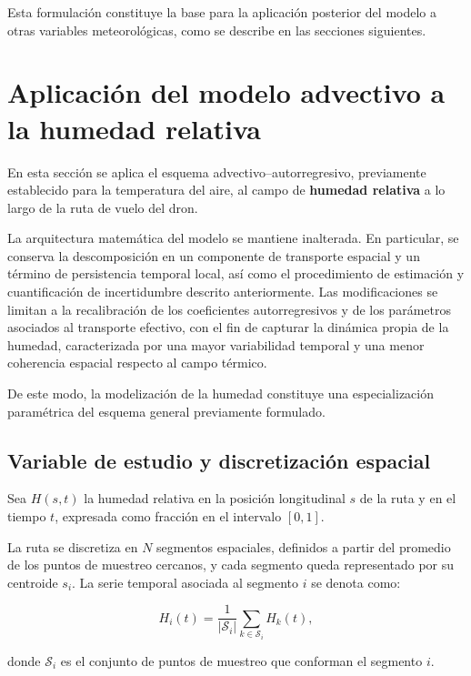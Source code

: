 \documentclass[
  spanish,
  us-letterpaper,
]{scrreprt}
\numberwithin{equation}{section}
\begin{document}
Esta formulación constituye la base para la aplicación posterior del
modelo a otras variables meteorológicas, como se describe en las
secciones siguientes.

\section{Aplicación del modelo advectivo a la humedad
relativa}\label{aplicaciuxf3n-del-modelo-advectivo-a-la-humedad-relativa}

En esta sección se aplica el esquema advectivo--autorregresivo,
previamente establecido para la temperatura del aire, al campo de
\textbf{humedad relativa} a lo largo de la ruta de vuelo del dron.

La arquitectura matemática del modelo se mantiene inalterada. En
particular, se conserva la descomposición en un componente de transporte
espacial y un término de persistencia temporal local, así como el
procedimiento de estimación y cuantificación de incertidumbre descrito
anteriormente. Las modificaciones se limitan a la recalibración de los
coeficientes autorregresivos y de los parámetros asociados al transporte
efectivo, con el fin de capturar la dinámica propia de la humedad,
caracterizada por una mayor variabilidad temporal y una menor coherencia
espacial respecto al campo térmico.

De este modo, la modelización de la humedad constituye una
especialización paramétrica del esquema general previamente formulado.

\subsection{Variable de estudio y discretización
espacial}\label{variable-de-estudio-y-discretizaciuxf3n-espacial-1}

Sea \(H(s,t)\) la humedad relativa en la posición longitudinal \(s\) de
la ruta y en el tiempo \(t\), expresada como fracción en el intervalo
\([0,1]\).

La ruta se discretiza en \(N\) segmentos espaciales, definidos a partir
del promedio de los puntos de muestreo cercanos, y cada segmento queda
representado por su centroide \(s_i\). La serie temporal asociada al
segmento \(i\) se denota como:

\[
H_i(t) = \frac{1}{|\mathcal{S}_i|} \sum_{k \in \mathcal{S}_i} H_k(t),
\]

donde \(\mathcal{S}_i\) es el conjunto de puntos de muestreo que
conforman el segmento \(i\).
\end{document}
